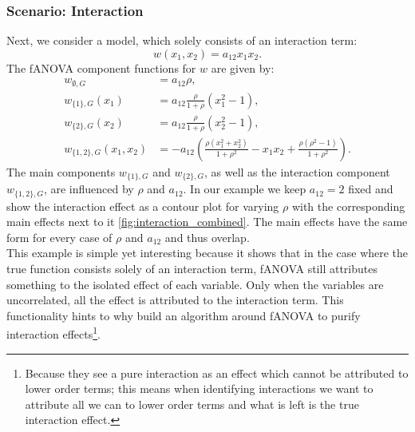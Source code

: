 \subsubsection{Scenario: Interaction}
Next, we consider a model, which solely consists of an interaction term:
$$w(x_1, x_2) = a_{12} x_1 x_2.$$
The fANOVA component functions for $w$ are given by:
\begin{align*}
    w_{\emptyset, G} &= a_{12} \rho, \\[0.5em]
    w_{\{1\}, G}(x_1) &= a_{12} \frac{\rho}{1+ \rho} (x_1^2 - 1), \\[0.5em]
    w_{\{2\}, G}(x_2) &= a_{12} \frac{\rho}{1+ \rho} (x_2^2 - 1), \\[0.5em]
    w_{\{1,2\}, G}(x_1,x_2) 
&= -a_{12}\!\left(
    \frac{\rho(x_1^2+x_2^2)}{1+\rho^2} 
    - x_1 x_2 
    + \frac{\rho(\rho^2-1)}{1+\rho^2}
   \right).
\end{align*}
The main components $w_{\{1\}, G}$ and $w_{\{2\}, G}$, as well as the interaction component $w_{\{1,2\}, G}$, are influenced by $\rho$ and $a_{12}$.
In our example we keep $a_{12} = 2$ fixed and show the interaction effect as a contour plot for varying $\rho$ with the corresponding main effects next to it \autoref{fig:interaction_combined}.
The main effects have the same form for every case of $\rho$ and $a_{12}$ and thus overlap.\\
This example is simple yet interesting because it shows that in the case where the true function consists solely of an interaction term, fANOVA still attributes something to the isolated effect of each variable. Only when the variables are uncorrelated, all the effect is attributed to the interaction term. This functionality hints to why \cite{lengerich2020} build an algorithm around fANOVA to purify interaction effects\footnote{Because they see a pure interaction as an effect which cannot be attributed to lower order terms; this means when identifying interactions we want to attribute all we can to lower order terms and what is left is the true interaction effect.}.


